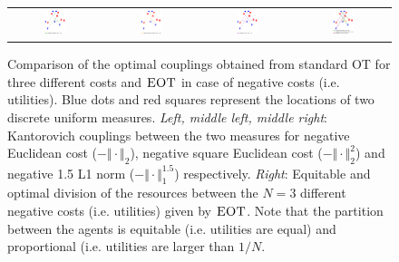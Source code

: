 \begin{figure}[h!]
\begin{tabular}{@{}c@{}c@{}c@{}c@{}}
\includegraphics[width=0.25\textwidth]{figures/primal_W_1_neg_norm.pdf}&
\includegraphics[width=0.25\textwidth]{figures/primal_W_2_neg_norm.pdf}&
\includegraphics[width=0.25\textwidth]{figures/primal_W_3_neg_norm.pdf}&
\includegraphics[width=0.25\textwidth]{figures/primal_W_1_2_3_neg_norm.pdf}
\end{tabular}
\caption{Comparison of the optimal couplings obtained from standard OT for three different costs and $\textsc{EOT}$ in case of negative costs (i.e. utilities). Blue dots and red squares represent the locations of two discrete uniform measures. \emph{Left, middle left, middle right}: Kantorovich couplings between the two measures for negative Euclidean cost ($-\Vert\cdot\Vert_2$), negative square Euclidean cost ($-\Vert\cdot\Vert_2^{2}$) and negative 1.5 L1 norm ($-\Vert\cdot\Vert_1^{1.5}$) respectively. \emph{Right}: Equitable and optimal division of the resources between the $N=3$ different negative costs (i.e. utilities) given by $\textsc{EOT}$.  Note that the partition between the agents is equitable (i.e. utilities are equal) and proportional (i.e. utilities are larger than $1/N$.}
\label{fig-primal-fair-appendix}
\end{figure}


